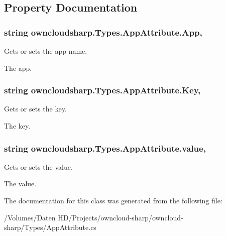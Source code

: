 \subsection{Property Documentation}
\hypertarget{classowncloudsharp_1_1_types_1_1_app_attribute_a3d8aaa71111ab1a2140e02fd2772e938}{}
\subsubsection[{App}]{\setlength{\rightskip}{0pt plus 5cm}string owncloudsharp.\+Types.\+App\+Attribute.\+App\hspace{0.3cm}{\ttfamily [get]}, {\ttfamily [set]}}\label{classowncloudsharp_1_1_types_1_1_app_attribute_a3d8aaa71111ab1a2140e02fd2772e938}


Gets or sets the app name. 

The app.\hypertarget{classowncloudsharp_1_1_types_1_1_app_attribute_a06720302305fa7ae8cb08121fd533d75}{}
\subsubsection[{Key}]{\setlength{\rightskip}{0pt plus 5cm}string owncloudsharp.\+Types.\+App\+Attribute.\+Key\hspace{0.3cm}{\ttfamily [get]}, {\ttfamily [set]}}\label{classowncloudsharp_1_1_types_1_1_app_attribute_a06720302305fa7ae8cb08121fd533d75}


Gets or sets the key. 

The key.\hypertarget{classowncloudsharp_1_1_types_1_1_app_attribute_a9bb5cce7716b37c3de9ffceea023e574}{}
\subsubsection[{value}]{\setlength{\rightskip}{0pt plus 5cm}string owncloudsharp.\+Types.\+App\+Attribute.\+value\hspace{0.3cm}{\ttfamily [get]}, {\ttfamily [set]}}\label{classowncloudsharp_1_1_types_1_1_app_attribute_a9bb5cce7716b37c3de9ffceea023e574}


Gets or sets the value. 

The value.

The documentation for this class was generated from the following file\+:\begin{DoxyCompactItemize}
\item 
/\+Volumes/\+Daten H\+D/\+Projects/owncloud-\/sharp/owncloud-\/sharp/\+Types/App\+Attribute.\+cs\end{DoxyCompactItemize}

